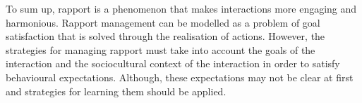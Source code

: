 To sum up, rapport is a phenomenon that makes interactions more engaging and harmonious. Rapport management can be modelled as a problem of goal satisfaction that is solved through the realisation of actions. However, the strategies for managing rapport must take into account the goals of the interaction and the sociocultural context of the interaction in order to satisfy behavioural expectations. Although, these expectations may not be clear at first and strategies for learning them should be applied.